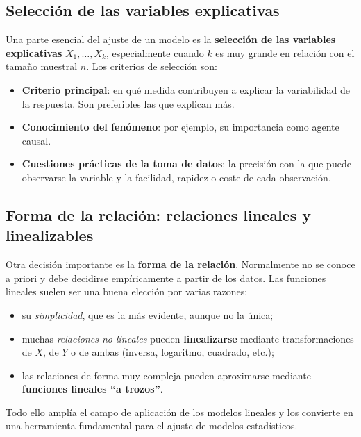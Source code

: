 \subsection{Selección de las variables explicativas}

Una parte esencial del ajuste de un modelo es la \textbf{selección de las variables
explicativas} $X_1,\ldots,X_k$, especialmente cuando $k$ es muy grande en relación con el
tamaño muestral $n$. Los criterios de selección son:
\begin{itemize}
  \item \textbf{Criterio principal}: en qué medida contribuyen a explicar la variabilidad de la
    respuesta. Son preferibles las que explican más.
  \item \textbf{Conocimiento del fenómeno}: por ejemplo, su importancia como agente causal.
  \item \textbf{Cuestiones prácticas de la toma de datos}: la precisión con la que puede
    observarse la variable y la facilidad, rapidez o coste de cada observación.
\end{itemize}

\subsection{Forma de la relación: relaciones lineales y linealizables}

Otra decisión importante es la \textbf{forma de la relación}. Normalmente no se conoce a priori
y debe decidirse empíricamente a partir de los datos. Las funciones lineales suelen ser una
buena elección por varias razones:
\begin{itemize}
  \item su \emph{simplicidad}, que es la más evidente, aunque no la única;
  \item muchas \emph{relaciones no lineales} pueden \textbf{linealizarse} mediante
    transformaciones de $X$, de $Y$ o de ambas (inversa, logaritmo, cuadrado, etc.);
  \item las relaciones de forma muy compleja pueden aproximarse mediante \textbf{funciones
    lineales ``a trozos''}.
\end{itemize}
Todo ello amplía el campo de aplicación de los modelos lineales y los convierte en una
herramienta fundamental para el ajuste de modelos estadísticos.

